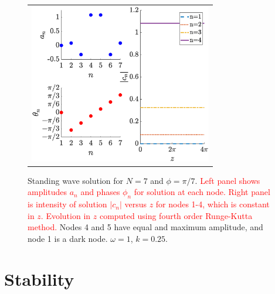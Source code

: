 \documentclass[reprint, amsmath,amssymb,aps,pra]{revtex4-2}
\renewcommand{\revised}[1]{ \textcolor{red}{#1} }
\begin{document}
\begin{figure}
\begin{center}
\begin{tabular}{c}
\includegraphics[width=8cm]{oddhole7.eps}
\end{tabular}
\end{center}
\caption{Standing wave solution for $N = 7$ and $\phi = \pi/7$. \revised{Left panel shows amplitudes $a_n$ and phases $\phi_n$ for solution at each node. Right panel is intensity of solution $|c_n|$ versus $z$ for nodes 1-4, which is constant in $z$. Evolution in $z$ computed using fourth order Runge-Kutta method.}  Nodes 4 and 5 have equal and maximum amplitude, and node 1 is a dark node. $\omega = 1$, $k = 0.25$.}
\label{fig:oddhole7}
\end{figure}

\section{Stability}\label{sec:stability}
\end{document}
